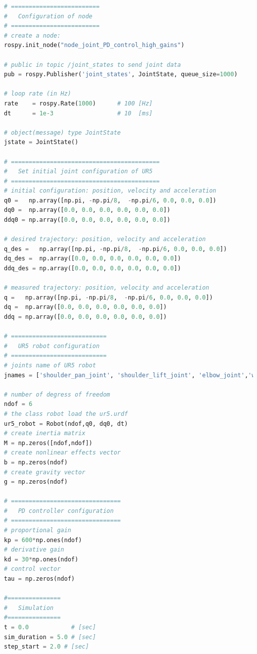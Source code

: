 \begin{lstlisting}[language=Python,caption={Move the second and fifth joint of UR5 robot with the required movement of activity 1.4.}, label={lst:joint_PD_control_high_gains}]
# =========================
#   Configuration of node
# =========================
# create a node: 
rospy.init_node("node_joint_PD_control_high_gains")

# public in topic /joint_states	to send joint data	
pub = rospy.Publisher('joint_states', JointState, queue_size=1000)

# loop rate (in Hz)
rate 	= rospy.Rate(1000)		# 100 [Hz]
dt 		= 1e-3					# 10  [ms]

# object(message) type JointState
jstate = JointState()

# ==========================================
#   Set initial joint configuration of UR5
# ==========================================
# initial configuration: position, velocity and acceleration 
q0 =   np.array([np.pi, -np.pi/8,  -np.pi/6, 0.0, 0.0, 0.0])
dq0 =  np.array([0.0, 0.0, 0.0, 0.0, 0.0, 0.0]) 
ddq0 = np.array([0.0, 0.0, 0.0, 0.0, 0.0, 0.0]) 

# desired trajectory: position, velocity and acceleration
q_des =   np.array([np.pi, -np.pi/8,  -np.pi/6, 0.0, 0.0, 0.0]) 
dq_des =  np.array([0.0, 0.0, 0.0, 0.0, 0.0, 0.0]) 
ddq_des = np.array([0.0, 0.0, 0.0, 0.0, 0.0, 0.0]) 

# measured trajectory: position, velocity and acceleration
q =   np.array([np.pi, -np.pi/8,  -np.pi/6, 0.0, 0.0, 0.0])
dq =  np.array([0.0, 0.0, 0.0, 0.0, 0.0, 0.0]) 
ddq = np.array([0.0, 0.0, 0.0, 0.0, 0.0, 0.0]) 

# ===========================
#   UR5 robot configuration
# ===========================
# joints name of UR5 robot
jnames = ['shoulder_pan_joint', 'shoulder_lift_joint', 'elbow_joint','wrist_1_joint', 'wrist_2_joint', 'wrist_3_joint']

# number of degress of freedom
ndof = 6
# the class robot load the ur5.urdf
ur5_robot = Robot(ndof,q0, dq0, dt)
# create inertia matrix 
M = np.zeros([ndof,ndof])
# create nonlinear effects vector
b = np.zeros(ndof)
# create gravity vector
g = np.zeros(ndof)

# ===============================
#   PD controller configuration
# ===============================
# proportional gain
kp = 600*np.ones(ndof)
# derivative gain
kd = 30*np.ones(ndof)
# control vector
tau = np.zeros(ndof)    

#===============
#   Simulation
#===============
t = 0.0            # [sec] 
sim_duration = 5.0 # [sec]
step_start = 2.0 # [sec]


\end{lstlisting}
